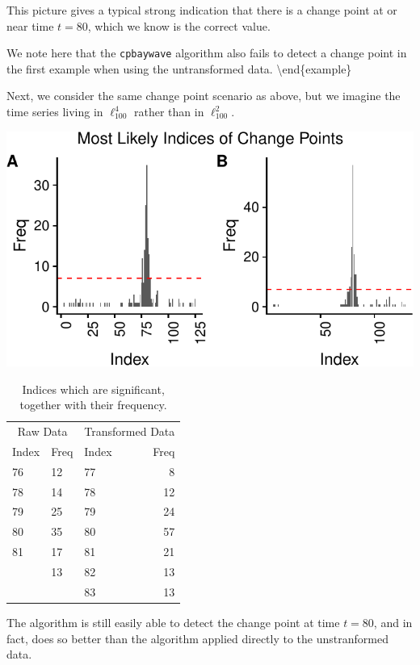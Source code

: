 \documentclass[smallextended]{svjour3}       %
\begin{document}
This picture gives a typical strong indication that there is a change
point at or near time \(t = 80\), which we know is the correct value.

We note here that the \texttt{cpbaywave} algorithm also fails to detect
a change point in the first example when using the untransformed data.
\textbackslash{}end\{example\}

Next, we consider the same change point scenario as above, but we
imagine the time series living in \(\ell_{100}^4\) rather than in
\(\ell_{100}^2\).

\begin{center}\includegraphics{springer_template_files/figure-latex/chunk_5_5-1} \end{center}

\begin{longtable}[t]{lllr}
\caption{\label{tab:chunk_5_75}Indices which are significant, together with their frequency.}\\
\toprule
\multicolumn{2}{c}{Raw Data} & \multicolumn{2}{c}{Transformed Data} \\
\cmidrule(l{2pt}r{2pt}){1-2} \cmidrule(l{2pt}r{2pt}){3-4}
Index & Freq & Index & Freq\\
\midrule
76 & 12 & 77 & 8\\
78 & 14 & 78 & 12\\
79 & 25 & 79 & 24\\
80 & 35 & 80 & 57\\
81 & 17 & 81 & 21\\
\addlinespace
82 & 13 & 82 & 13\\
 &  & 83 & 13\\
\bottomrule
\end{longtable}

The algorithm is still easily able to detect the change point at time
\(t = 80\), and in fact, does so better than the algorithm applied
directly to the unstranformed data.
\end{document}
